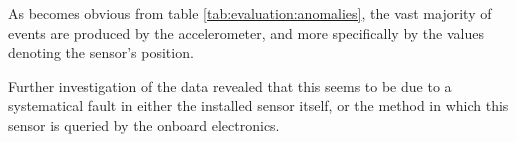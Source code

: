 As becomes obvious from table \ref{tab:evaluation:anomalies}, the vast majority of events are produced by the accelerometer, and more specifically by the values denoting the sensor's position.

Further investigation of the data revealed that this seems to be due to a systematical fault in either the installed sensor itself, or the method in which this sensor is queried by the onboard electronics.

